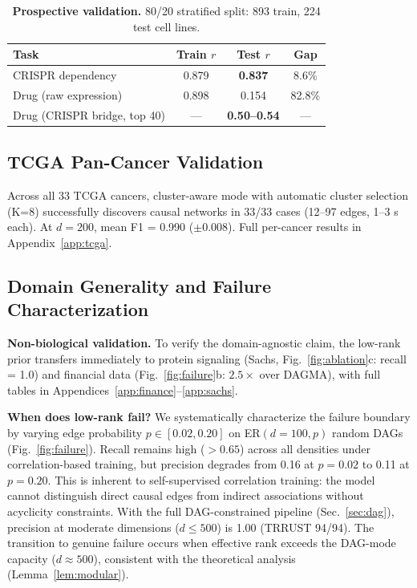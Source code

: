 \documentclass{article}
\theoremstyle{definition}
\begin{document}
\begin{table}[t]
\centering
\caption{\textbf{Prospective validation.} 80/20 stratified split: 893 train, 224 test cell lines.}
\label{tab:prospective}
\small
\begin{tabular}{lccc}
\toprule
Task & Train $r$ & Test $r$ & Gap \\
\midrule
CRISPR dependency & 0.879 & \textbf{0.837} & 8.6\% \\
Drug (raw expression) & 0.898 & 0.154 & 82.8\% \\
Drug (CRISPR bridge, top 40) & --- & \textbf{0.50--0.54} & --- \\
\bottomrule
\end{tabular}
\end{table}

\subsection{TCGA Pan-Cancer Validation}

Across all 33 TCGA cancers, cluster-aware mode with automatic cluster selection (K=8) successfully discovers causal networks in 33/33 cases (12--97 edges, 1--3 s each). At $d=200$, mean F1 = 0.990 ($\pm$0.008). Full per-cancer results in Appendix~\ref{app:tcga}.

\subsection{Domain Generality and Failure Characterization}

\textbf{Non-biological validation.} To verify the domain-agnostic claim, the low-rank prior transfers immediately to protein signaling (Sachs, Fig.~\ref{fig:ablation}c: recall = 1.0) and financial data (Fig.~\ref{fig:failure}b: $2.5\times$ over DAGMA), with full tables in Appendices~\ref{app:finance}--\ref{app:sachs}.

\textbf{When does low-rank fail?} We systematically characterize the failure boundary by varying edge probability $p \in [0.02, 0.20]$ on ER$(d=100, p)$ random DAGs (Fig.~\ref{fig:failure}). Recall remains high ($>0.65$) across all densities under correlation-based training, but precision degrades from 0.16 at $p=0.02$ to 0.11 at $p=0.20$. This is inherent to self-supervised correlation training: the model cannot distinguish direct causal edges from indirect associations without acyclicity constraints. With the full DAG-constrained pipeline (Sec.~\ref{sec:dag}), precision at moderate dimensions ($d \le 500$) is 1.00 (TRRUST 94/94). The transition to genuine failure occurs when effective rank exceeds the DAG-mode capacity ($d \approx 500$), consistent with the theoretical analysis (Lemma~\ref{lem:modular}).
\end{document}
